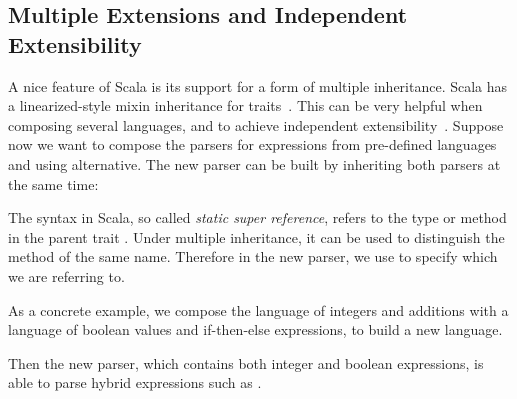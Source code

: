 \subsection{Multiple Extensions and Independent Extensibility}
A nice feature of Scala is its support for a form of multiple
inheritance.  Scala has a linearized-style mixin inheritance for
traits~\cite{odersky2004overview}. This can be very helpful when
composing several languages, and to achieve independent
extensibility~\cite{odersky2005independently}.
Suppose now we want to compose the parsers for expressions
from pre-defined languages  and
 using alternative. The new parser can be built
by inheriting both parsers at the same time:


The  syntax in Scala, so called \textit{static super reference}, refers to the type or method  in the parent trait . Under multiple inheritance, it can be used to distinguish the method of the same name. Therefore in the new parser, we use  to specify which  we are referring to.

As a concrete example, we compose the language of integers and additions with a language of boolean values and if-then-else expressions, to build a new language.


\begin{comment}
\bruno{You can present the abstract example, as you do
  here, but you should also present a concrete example. You
already have Var, maybe you can add another language extension for
boolean literals. Show the code for the boolean literals parsing as
well as the composition code.}

Interestingly note that, due to the use of multiple inheritance, we
need two different super calls.\bruno{expand here. People may not
be familiar with scala super calls, you have to explain what the
syntax does.}
\end{comment}

Then the new parser, which contains both integer and boolean
expressions, is able to parse hybrid expressions such as
.

